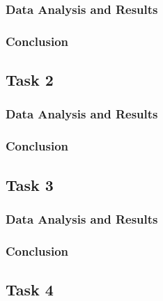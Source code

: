 \documentclass[a4paper]{article}
\begin{document}
\subsubsection{Data Analysis and Results}

\subsubsection{Conclusion}

\subsection{Task 2}

\subsubsection{Data Analysis and Results}

\subsubsection{Conclusion}

\subsection{Task 3}

\subsubsection{Data Analysis and Results}

\subsubsection{Conclusion}

\subsection{Task 4}
\end{document}
